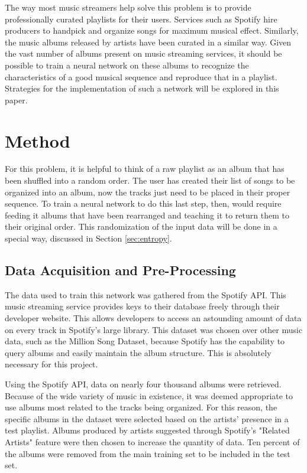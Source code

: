 \documentclass{article}
\begin{document}
The way most music streamers help solve this problem is to provide professionally curated playlists for their users. Services such as Spotify hire producers to handpick and organize songs for maximum musical effect. Similarly, the music albums released by artists have been curated in a similar way. Given the vast number of albums present on music streaming services, it should be possible to train a neural network on these albums to recognize the characteristics of a good musical sequence and reproduce that in a playlist. Strategies for the implementation of such a network will be explored in this paper.

\section{Method}
For this problem, it is helpful to think of a raw playlist as an album that has been shuffled into a random order. The user has created their list of songs to be organized into an album, now the tracks just need to be placed in their proper sequence. To train a neural network to do this last step, then, would require feeding it albums that have been rearranged and teaching it to return them to their original order. This randomization of the input data will be done in a special way, discussed in Section \ref{sec:entropy}.

\subsection{Data Acquisition and Pre-Processing}
The data used to train this network was gathered from the Spotify API. This music streaming service provides keys to their database freely through their developer website\footnotemark. This allows developers to access an astounding amount of data on every track in Spotify's large library. This dataset was chosen over other music data, such as the Million Song Dataset, because Spotify has the capability to query albums and easily maintain the album structure. This is absolutely necessary for this project.

Using the Spotify API, data on nearly four thousand albums were retrieved. Because of the wide variety of music in existence, it was deemed appropriate to use albums most related to the tracks being organized. For this reason, the specific albums in the dataset were selected based on the artists' presence in a test playlist. Albums produced by artists suggested through Spotify's "Related Artists" feature were then chosen to increase the quantity of data. Ten percent of the albums were removed from the main training set to be included in the test set.
\end{document}

